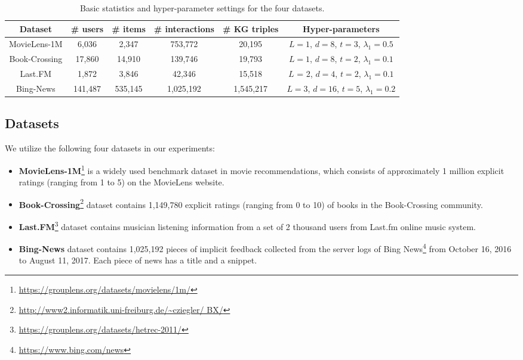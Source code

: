 \documentclass[sigconf]{acmart}
\begin{document}
	\begin{table*}[t]
\setlength{\tabcolsep}{8pt}
		\centering
		\caption{Basic statistics and hyper-parameter settings for the four datasets.}
		\begin{tabular}{c|cccc|c}
			\hline
			Dataset & \# users & \# items & \# interactions & \# KG triples & Hyper-parameters\\
			\hline
			MovieLens-1M & 6,036 & 2,347 & 753,772 & 20,195 & $L = 1$, $d = 8$, $t = 3$, $\lambda_1 = 0.5$\\
			Book-Crossing & 17,860 & 14,910 & 139,746 & 19,793 & $L = 1$, $d = 8$, $t = 2$, $\lambda_1 = 0.1$\\
			Last.FM & 1,872 & 3,846 & 42,346 & 15,518 & $L$ = 2, $d = 4$, $t = 2$, $\lambda_1 = 0.1$\\
			Bing-News & 141,487 & 535,145 & 1,025,192 & 1,545,217 & $L = 3$, $d = 16$, $t = 5$, $\lambda_1 = 0.2$\\
			\hline
		\end{tabular}
		\label{table:statistics}
	\end{table*}	
		
	\subsection{Datasets}
		We utilize the following four datasets in our experiments:
		\begin{itemize}
			\item
				\textbf{MovieLens-1M}\footnote{\url{https://grouplens.org/datasets/movielens/1m/}} is a widely used benchmark dataset in movie recommendations, which consists of approximately 1 million explicit ratings (ranging from 1 to 5) on the MovieLens website.
			\item
				\textbf{Book-Crossing}\footnote{\url{http://www2.informatik.uni-freiburg.de/~cziegler/ BX/}} dataset contains 1,149,780 explicit ratings (ranging from 0 to 10) of books in the Book-Crossing community.
			\item
				\textbf{Last.FM}\footnote{\url{https://grouplens.org/datasets/hetrec-2011/}} dataset contains musician listening information from a set of 2 thousand users from Last.fm online music system.
			\item
				\textbf{Bing-News} dataset contains 1,025,192 pieces of implicit feedback collected from the server logs of Bing News\footnote{\url{https://www.bing.com/news}} from October 16, 2016 to August 11, 2017.
				Each piece of news has a title and a snippet.
		\end{itemize}
		
\end{document}
